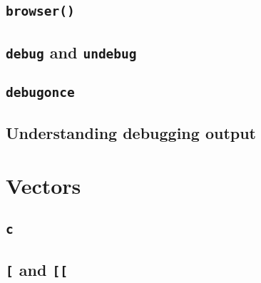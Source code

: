 \documentclass[
]{book}
\begin{document}
\hypertarget{browser}{%
\section{\texorpdfstring{\texttt{browser()}}{browser()}}\label{browser}}

\hypertarget{debug-and-undebug}{%
\section{\texorpdfstring{\texttt{debug} and \texttt{undebug}}{debug and undebug}}\label{debug-and-undebug}}

\hypertarget{debugonce}{%
\section{\texorpdfstring{\texttt{debugonce}}{debugonce}}\label{debugonce}}

\hypertarget{understanding-debugging-output}{%
\section{Understanding debugging output}\label{understanding-debugging-output}}

\hypertarget{vectors-1}{%
\chapter{Vectors}\label{vectors-1}}

\hypertarget{c}{%
\section{\texorpdfstring{\texttt{c}}{c}}\label{c}}

\hypertarget{and}{%
\section{\texorpdfstring{\texttt{{[}} and \texttt{{[}{[}}}{{[} and {[}{[}}}\label{and}}
\end{document}
